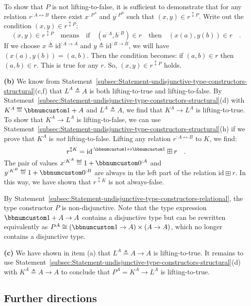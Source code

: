 To show that $P$ is not lifting-to-false, it is sufficient to demonstrate
that for any relation $r^{:A\leftrightarrow B}$ there exist $x^{:P^{A}}$
and $y^{:P^{B}}$ such that $(x,y)\in r^{\updownarrow P}$. Write
out the condition $(x,y)\in r^{\updownarrow P}$:
\[
(x,y)\in r^{\updownarrow P}\quad\text{means}\quad\text{if}\quad(a^{:A},b^{:B})\in r\quad\text{then}\quad(x(a),y(b))\in r\quad.
\]
If we choose $x\triangleq\text{id}^{:A\rightarrow A}$ and $y\triangleq\text{id}^{:B\rightarrow B}$,
we will have $(x(a),y(b))=(a,b)$. Then the condition becomes: if
$(a,b)\in r$ then $(a,b)\in r$. This is true for any $r$. So, $(x,y)\in r^{\updownarrow P}$
holds.

\textbf{(b)} We know from Statement~\ref{subsec:Statement-undisjunctive-type-constructors-structural}(c,f)
that $L^{A}\triangleq A$ is both lifting-to-true and lifting-to-false.
By Statement~\ref{subsec:Statement-undisjunctive-type-constructors-structural}(d)
with $K^{A}\triangleq\bbnum 1+A$ and $L^{A}\triangleq A$, we find
that $K^{A}\rightarrow L^{A}$ is lifting-to-true. To show that $K^{A}\rightarrow L^{A}$
is lifting-to-false, we can use Statement~\ref{subsec:Statement-undisjunctive-type-constructors-structural}(h)
if we prove that $K^{A}$ is \emph{not} lifting-to-false. Lifting
any relation $r^{:A\leftrightarrow B}$ to $K$, we find:
\[
r^{\updownarrow K}=\text{id}^{:\bbnum 1\leftrightarrow\bbnum 1}\boxplus r\quad.
\]
The pair of values $x^{:K^{A}}\triangleq1+\bbnum 0^{:A}$ and $y^{:K^{B}}\triangleq1+\bbnum 0^{:B}$
are always in the left part of the relation $\text{id}\boxplus r$.
In this way, we have shown that $r^{\updownarrow K}$ is not always-false. 

By Statement~\ref{subsec:Statement-undisjunctive-type-constructors-relational},
the type constructor $P$ is non-disjunctive. Note that the type expression
$\bbnum 1+A\rightarrow A$ contains a disjunctive type but can be
rewritten equivalently as $P^{A}\cong(\bbnum 1\rightarrow A)\times(A\rightarrow A)$,
which no longer contains a disjunctive type.

\textbf{(c)} We have shown in item (a) that $L^{A}\triangleq A\rightarrow A$
is lifting-to-true. It remains to use Statement~\ref{subsec:Statement-undisjunctive-type-constructors-structural}(d)
with $K^{A}\triangleq A\rightarrow A$ to conclude that $P^{A}=K^{A}\rightarrow L^{A}$
is lifting-to-true.

\subsection{Further directions}

